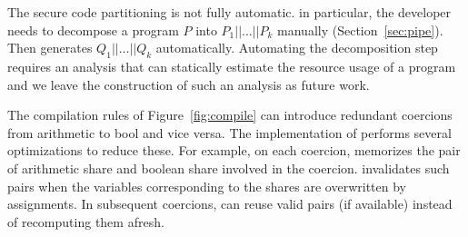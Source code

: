 The secure code partitioning is not fully automatic.
in particular, the developer needs to decompose a program $P$ into $P_1||\ldots||P_k$ manually (Section~\ref{sec:pipe}). Then \tool generates $Q_1||\ldots||Q_k$ automatically.
Automating the decomposition step requires an analysis that can 
statically estimate the resource usage of a \tool program and we leave the construction of such
an analysis as future work.

The compilation rules of Figure~\ref{fig:compile} can introduce redundant coercions from arithmetic to
bool and vice versa.
The implementation of \tool performs several optimizations to reduce these.
For example, on each coercion, \tool memorizes the pair of arithmetic share and boolean share involved in the coercion.
\tool invalidates such pairs when the variables corresponding to the shares are overwritten by assignments.
In subsequent coercions, \tool can reuse valid pairs (if available) instead of recomputing them afresh. 

 